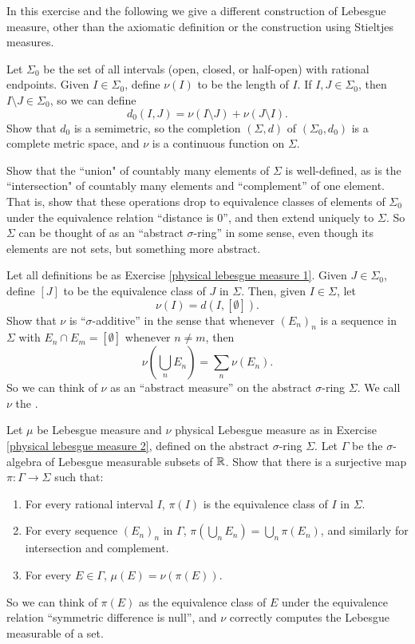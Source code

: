 \begin{exercise}
\label{physical lebesgue measure 1}
In this exercise and the following we give a different construction of Lebesgue measure, other than the axiomatic definition or the construction using Stieltjes measures.

Let $\Sigma_0$ be the set of all intervals (open, closed, or half-open) with rational endpoints.
Given $I \in \Sigma_0$, define $\nu(I)$ to be the length of $I$.
If $I, J \in \Sigma_0$, then $I \setminus J \in \Sigma_0$, so we can define
\[d_0(I, J) = \nu(I \setminus J) + \nu(J \setminus I).\]
Show that $d_0$ is a semimetric, so the completion $(\Sigma, d)$ of $(\Sigma_0, d_0)$ is a complete metric space, and $\nu$ is a continuous function on $\Sigma$.

Show that the ``union" of countably many elements of $\Sigma$ is well-defined, as is the ``intersection" of countably many elements and ``complement'' of one element.
That is, show that these operations drop to equivalence classes of elements of $\Sigma_0$ under the equivalence relation ``distance is $0$'', and then extend uniquely to $\Sigma$.
So $\Sigma$ can be thought of as an ``abstract $\sigma$-ring'' in some sense, even though its elements are not sets, but something more abstract.
\end{exercise}

\begin{exercise}
\label{physical lebesgue measure 2}
Let all definitions be as Exercise \ref{physical lebesgue measure 1}.
Given $J \in \Sigma_0$, define $[J]$ to be the equivalence class of $J$ in $\Sigma$.
Then, given $I \in \Sigma$, let
\[\nu(I) = d(I, [\emptyset]).\]
Show that $\nu$ is ``$\sigma$-additive'' in the sense that whenever $(E_{n})_{n}$ is a sequence in $\Sigma$ with $E_{n} \cap E_{m} = [\emptyset]$ whenever $n \neq m$, then
\[\nu\left(\bigcup_{n} E_{n}\right) = \sum_{n} \nu(E_{n}).\]
So we can think of $\nu$ as an ``abstract measure'' on the abstract $\sigma$-ring $\Sigma$.
We call $\nu$ the .
\end{exercise}

\begin{exercise}
\label{physical lebesgue measure 3}
Let $\mu$ be Lebesgue measure and $\nu$ physical Lebesgue measure as in Exercise \ref{physical lebesgue measure 2}, defined on the abstract $\sigma$-ring $\Sigma$.
Let $\Gamma$ be the $\sigma$-algebra of Lebesgue measurable subsets of $\mathbb{R}$. Show that there is a surjective map $\pi: \Gamma \to \Sigma$ such that:
\begin{enumerate}
\item For every rational interval $I$, $\pi(I)$ is the equivalence class of $I$ in $\Sigma$.
\item For every sequence $(E_{n})_{n}$ in $\Gamma$, $\pi(\bigcup_{n} E_{n}) = \bigcup_{n} \pi(E_{n})$, and similarly for intersection and complement.
\item For every $E \in \Gamma$, $\mu(E) = \nu(\pi(E))$.
\end{enumerate}
So we can think of $\pi(E)$ as the equivalence class of $E$ under the equivalence relation ``symmetric difference is null'', and $\nu$ correctly computes the Lebesgue measurable of a set.
\end{exercise}

